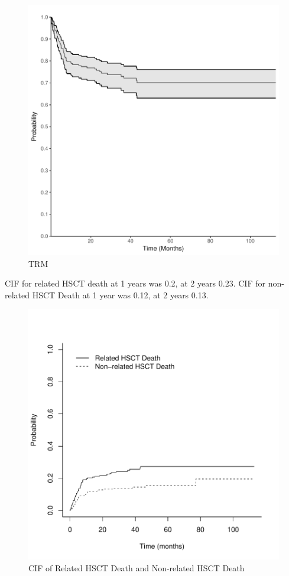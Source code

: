 \documentclass[a4paper,11pt] {article}
\begin{document}
\begin{figure}[h]
\begin{center}
\includegraphics{Rapport-fig89}
\end{center}
\caption{TRM}
\label{fig89}
\end{figure}






CIF for related HSCT death at 1 years was 0.2, at 2 years  0.23.
CIF for non-related HSCT Death at 1 year was 0.12, at 2 years  0.13.
\begin{figure}[h]
\begin{center}
\includegraphics{Rapport-fig5}
\end{center}
\caption{CIF of Related HSCT Death and Non-related HSCT Death}
\label{fig5}
\end{figure}
\end{document}
